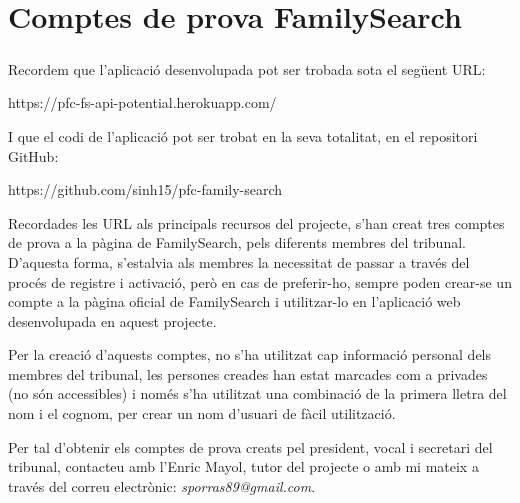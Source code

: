 \chapter{Comptes de prova FamilySearch}

\paragraph{}
Recordem que l'aplicació desenvolupada pot ser trobada sota el següent URL:

https://pfc-fs-api-potential.herokuapp.com/

I que el codi de l'aplicació pot ser trobat en la seva totalitat, en el repositori GitHub:

https://github.com/sinh15/pfc-family-search

Recordades les URL als principals recursos del projecte, s'han creat tres comptes de prova a la pàgina de FamilySearch, pels diferents membres del tribunal. D’aquesta forma, s’estalvia als membres la necessitat de passar a través del procés de registre i activació, però en cas de preferir-ho, sempre poden crear-se un compte a la pàgina oficial de FamilySearch i utilitzar-lo en l’aplicació web desenvolupada en aquest projecte.

Per la creació d’aquests comptes, no s’ha utilitzat cap informació personal dels membres del tribunal, les persones creades han estat marcades com a privades (no són accessibles) i només s’ha utilitzat una combinació de la primera lletra del nom i el cognom, per crear un nom d’usuari de fàcil utilització.

Per tal d'obtenir els comptes de prova creats pel president, vocal i secretari del tribunal, contacteu amb l'Enric Mayol, tutor del projecte o amb mi mateix a través del correu electrònic: \emph{sporras89@gmail.com}.
